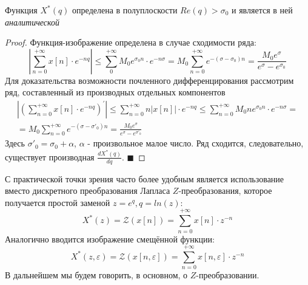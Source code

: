 \documentclass[12pt,twoside]{report}
\theoremstyle{MyNonumberplain}
\begin{document}
        \begin{theorem}
            Функция $X^*(q)$ определена в полуплоскости $Re(q)>\sigma_0$ и является в ней \textit{аналитической}
        \end{theorem}
        \begin{proof}
            Функция-изображение определена в случае сходимости ряда:            
            \begin{equation*}
                \left| \sum_{n=0}^{+\infty} x[n] \cdot e^{-nq}\right| \leq \sum_0^{+\infty}M_0e^{\sigma_0 n} \cdot e^{-n\sigma} =
                M_0 \sum_{n=0}^{+\infty}e^{-(\sigma - \sigma_0)n}=\frac{M_0e^\sigma}{e^{\sigma}-e^{\sigma_0}}
            \end{equation*}
            Для доказательства возможности почленного дифференцирования рассмотрим ряд, составленный
            из производных отдельных компонентов
            \begin{eqnarray*}
                \left|\left(\sum_{n=0}^{+\infty} x[n] \cdot e^{-nq}\right)^{'}\right| 
                \leq \sum_{n=0}^{+\infty} n |x[n]| \cdot e^{-nq}
                \leq \sum_{n=0}^{+\infty}M_0ne^{\sigma_0 n} \cdot e^{-n\sigma} =\\
                =M_0 \sum_{n=0}^{+\infty}e^{-(\sigma - \sigma'_0)n}=\frac{M_0e^\sigma}{e^{\sigma}-e^{\sigma'_0}}                   
            \end{eqnarray*}
            Здесь $\sigma'_0 = \sigma_0+\alpha$, $\alpha$ - произвольное малое число. Ряд сходится, следовательно, существует
            производная $\frac{dX^*(q)}{dq}$. $\blacksquare$            
        \end{proof}

    
            С практической точки зрения часто более удобным является использование вместо
            дискретного преобразования Лапласа $Z$-преобразования, которое получается
            простой заменой $z=e^q, q=ln(z)$:
            \begin{equation}\label{Ztransform}
                X^*(z)= \mathcal{Z}(x[n])=\sum_{n=0}^{+\infty} x[n] \cdot z^{-n}
            \end{equation}
            Аналогично вводится изображение смещённой функции:
            \begin{equation*}
                X^*(z,\varepsilon)=\mathcal{Z}(x[n,\varepsilon])=\sum_{n=0}^{+\infty} x[n,\varepsilon] \cdot z^{-n}
            \end{equation*}
            В дальнейшем мы будем говорить, в основном, о $Z$-преобразовании.
    
\end{document}
